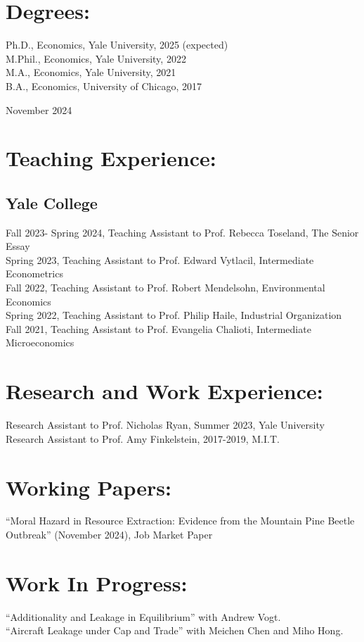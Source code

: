 \documentclass[11pt,letterpaper]{article}
\begin{document}
\section*{Degrees:}
Ph.D., Economics, Yale University, 2025 (expected) \\
M.Phil., Economics, Yale University, 2022 \\
M.A., Economics, Yale University, 2021 \\
B.A., Economics, University of Chicago, 2017

\newpage

\noindent November 2024

\section*{Teaching Experience:}

\subsection*{Yale College}
Fall 2023- Spring 2024, Teaching Assistant to Prof. Rebecca Toseland, The Senior Essay \\
Spring 2023, Teaching Assistant to Prof. Edward Vytlacil, Intermediate Econometrics \\
Fall 2022, Teaching Assistant to Prof. Robert Mendelsohn, Environmental Economics \\
Spring 2022, Teaching Assistant to Prof. Philip Haile, Industrial Organization \\
Fall 2021, Teaching Assistant to Prof. Evangelia Chalioti, Intermediate Microeconomics

\section*{Research and Work Experience:}
Research Assistant to Prof. Nicholas Ryan, Summer 2023, Yale University \\
Research Assistant to Prof. Amy Finkelstein, 2017-2019, M.I.T.

\section*{Working Papers:}
``Moral Hazard in Resource Extraction: Evidence from the Mountain Pine Beetle Outbreak'' (November 2024), Job Market Paper

\section*{Work In Progress:}
``Additionality and Leakage in Equilibrium'' with Andrew Vogt. \\
``Aircraft Leakage under Cap and Trade'' with Meichen Chen and Miho Hong.
\end{document}
